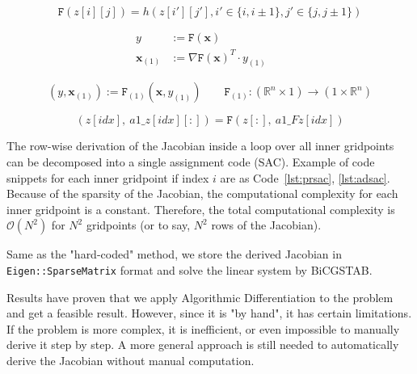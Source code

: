 \documentclass[11pt]{scrartcl}
\newcommand{\rb}[1]{\left( #1 \right)}
\begin{document}
\begin{equation}
\mathtt{F}\rb{z[i][j]} = h\rb{z[i'][j'], i'\in\{i, i\pm1\}, j'\in\{j,j\pm1\}}\label{eq:mso}
\end{equation}

\begin{align}
y &:= \mathtt{F}(\textbf{x})\label{eq:adj1} &&
\\
\textbf{x}_{(1)} &:= \nabla \mathtt{F}(\textbf{x})^{T} \cdot y_{(1)}\label{eq:adj2}
\end{align}

\begin{equation}
\rb{y, \textbf{x}_{(1)}} := \mathtt{F}_{(1)}\rb{\textbf{x}, y_{(1)}}\qquad \mathtt{F}_{(1)}: \rb{\mathbb{R}^n\times 1}\rightarrow \rb{1\times\mathbb{R}^n}\label{eq:adj}
\end{equation}

\begin{equation}
\rb{z[idx],\ a1\_z[idx][:]} = \mathtt{F}\rb{z[:],\ a1\_Fz[idx]}
\label{eq:adj.driver}
\end{equation}

The row-wise derivation of the Jacobian inside a loop over all inner gridpoints can be decomposed into a single assignment code (SAC). Example of code snippets for each inner gridpoint if index $i$ are as Code~\ref{lst:prsac}, \ref{lst:adsac}. Because of the sparsity of the Jacobian, the computational complexity for each inner gridpoint is a constant. Therefore, the total computational complexity is $\mathcal{O}(N^2)$ for $N^2$ gridpoints (or to say, $N^2$ rows of the Jacobian).

Same as the "hard-coded" method, we store the derived Jacobian in \texttt{Eigen::SparseMatrix} format and solve the linear system by BiCGSTAB.

Results have proven that we apply Algorithmic Differentiation to the problem and get a feasible result. However, since it is "by hand", it has certain limitations. If the problem is more complex, it is inefficient, or even impossible to manually derive it step by step. A more general approach is still needed to automatically derive the Jacobian without manual computation.

\end{document}
